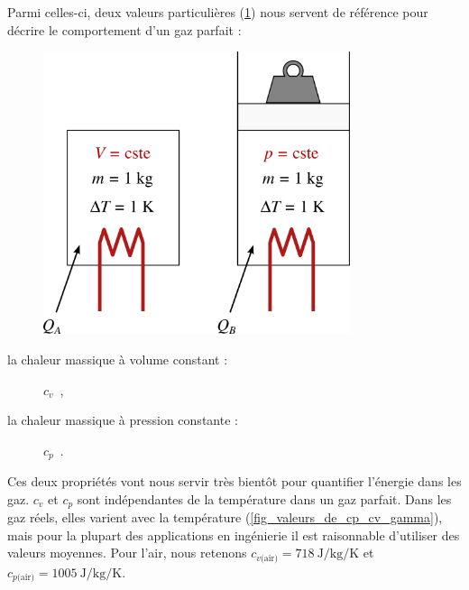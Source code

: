 		Parmi celles-ci, deux valeurs particulières (\cref{fig_cp_et_cv}) nous servent de référence pour décrire le comportement d’un gaz parfait :

		\begin{figure}
			\begin{center}
				\includegraphics[width=9cm]{images/capacites_calorifiques.png}
			\end{center}
			\label{fig_cp_et_cv}
		\end{figure}
		
		\begin{description}
			\item[la chaleur massique à volume constant :]$c_v$~, \dontbreakpage
			\item[la chaleur massique à pression constante :]$c_p$~.
		\end{description}

		Ces deux propriétés vont nous servir très bientôt pour quantifier l’énergie dans les gaz. $c_v$ et $c_p$ sont indépendantes de la température dans un gaz parfait. Dans les gaz réels, elles varient avec la température (\cref{fig_valeurs_de_cp_cv_gamma}), mais pour la plupart des applications en ingénierie il est raisonnable d’utiliser des valeurs moyennes. Pour l’air, nous retenons $c_{v\text{(air)}} = \SI{718}{\joule\per\kilogram\per\kelvin}$ et $c_{p\text{(air)}} = \SI{1005}{\joule\per\kilogram\per\kelvin}$.

